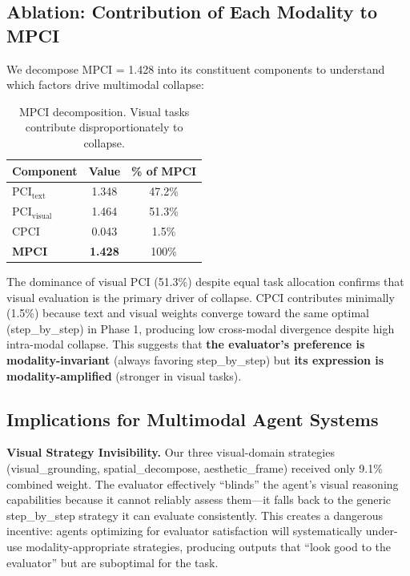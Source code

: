 \documentclass[11pt,a4paper]{article}
\begin{document}
\subsection{Ablation: Contribution of Each Modality to MPCI}

We decompose MPCI = 1.428 into its constituent components to understand which factors drive multimodal collapse:

\begin{table}[H]
\centering
\caption{MPCI decomposition. Visual tasks contribute disproportionately to collapse.}
\begin{tabular}{lcc}
\toprule
\textbf{Component} & \textbf{Value} & \textbf{\% of MPCI} \\
\midrule
PCI$_{\text{text}}$     & 1.348 & 47.2\% \\
PCI$_{\text{visual}}$   & 1.464 & 51.3\% \\
CPCI                    & 0.043 & 1.5\% \\
\midrule
\textbf{MPCI}           & \textbf{1.428} & 100\% \\
\bottomrule
\end{tabular}
\label{tab:mpci_decomp}
\end{table}

The dominance of visual PCI (51.3\%) despite equal task allocation confirms that visual evaluation is the primary driver of collapse. CPCI contributes minimally (1.5\%) because text and visual weights converge toward the same optimal (step\_by\_step) in Phase 1, producing low cross-modal divergence despite high intra-modal collapse. This suggests that \textbf{the evaluator's preference is modality-invariant} (always favoring step\_by\_step) but \textbf{its expression is modality-amplified} (stronger in visual tasks).

\subsection{Implications for Multimodal Agent Systems}

\textbf{Visual Strategy Invisibility.} Our three visual-domain strategies (visual\_grounding, spatial\_decompose, aesthetic\_frame) received only 9.1\% combined weight. The evaluator effectively ``blinds'' the agent's visual reasoning capabilities because it cannot reliably assess them---it falls back to the generic step\_by\_step strategy it can evaluate consistently. This creates a dangerous incentive: agents optimizing for evaluator satisfaction will systematically under-use modality-appropriate strategies, producing outputs that ``look good to the evaluator'' but are suboptimal for the task.
\end{document}
